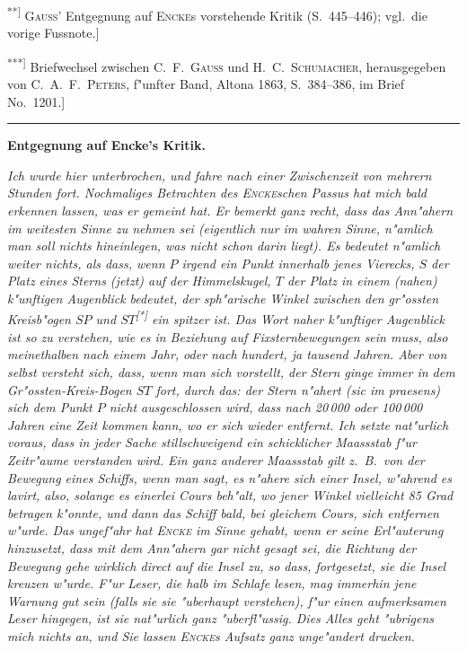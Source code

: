 \documentclass[12pt,a4paper]{article}
\theoremstyle{plain}
\theoremstyle{definition}
\theoremstyle{remark}
\begin{document}
{{\textsuperscript{**]} \textsc{Gauss}' Entgegnung auf \textsc{Encke}s vorstehende Kritik (S.\ 445--446); vgl.\ die vorige Fussnote.]

\textsuperscript{***]} Briefwechsel zwischen C.\ F.\ \textsc{Gauss} und H.\ C.\ \textsc{Schumacher}, herausgegeben von C.\ A.\ F.\ \textsc{Peters}, f"unfter Band, Altona 1863, S.\ 384--386, im Brief No.\ 1201.]
}
\rule{\textwidth}{0.4pt}


\newpage
\begin{center}
\textbf{Entgegnung auf Encke's Kritik.}
\end{center}

\noindent
{\itshape Ich wurde hier unterbrochen, und fahre nach einer Zwischenzeit von mehrern Stunden fort. Nochmaliges Betrachten des \textsc{Encke}schen Passus hat mich bald erkennen lassen, was er gemeint hat. Er bemerkt ganz recht, dass das \glq{}Ann"ahern\grq{} im weitesten Sinne zu nehmen sei (eigentlich nur im wahren Sinne, n"amlich man soll nichts hineinlegen, was nicht schon darin liegt). Es bedeutet n"amlich weiter nichts, als dass, wenn $P$ irgend ein Punkt innerhalb jenes Vierecks, $S$ der Platz eines Sterns (jetzt) auf der Himmelskugel, $T$ der Platz in einem (nahen) k"unftigen Augenblick bedeutet, der sph"arische Winkel zwischen den gr"ossten Kreisb"ogen $SP$ und $ST$\textsuperscript{[*]} ein spitzer ist. Das Wort \glq{}naher k"unftiger Augenblick\grq{} ist so zu verstehen, wie es in Beziehung auf Fixsternbewegungen sein muss, also meinethalben nach einem Jahr, oder nach hundert, ja tausend Jahren. Aber von selbst versteht sich, dass, wenn man sich vorstellt, der Stern ginge immer in dem Gr"ossten-Kreis-Bogen $ST$ fort, durch das: \glq{}der Stern n"ahert (sic im praesens) sich dem Punkt $P$\grq{} nicht ausgeschlossen wird, dass nach 20\,000 oder 100\,000 Jahren eine Zeit kommen kann, wo er sich wieder entfernt. Ich setzte nat"urlich voraus, dass in jeder Sache stillschweigend ein schicklicher Maassstab f"ur Zeitr"aume verstanden wird. Ein ganz anderer Maassstab gilt z.\ B.\ von der Bewegung eines Schiffs, wenn man sagt, es n"ahere sich einer Insel, w"ahrend es lavirt, also, solange es einerlei Cours beh"alt, wo jener Winkel vielleicht 85 Grad betragen k"onnte, und dann das Schiff bald, bei gleichem Cours, sich entfernen w"urde. Das ungef"ahr hat \textsc{Encke} im Sinne gehabt, wenn er seine Erl"auterung hinzusetzt, dass mit dem Ann"ahern gar nicht gesagt sei, die Richtung der Bewegung gehe wirklich direct auf die Insel zu, so dass, fortgesetzt, sie die Insel kreuzen w"urde. F"ur Leser, die halb im Schlafe lesen, mag immerhin jene Warnung gut sein (falls sie sie "uberhaupt verstehen), f"ur einen aufmerksamen Leser hingegen, ist sie nat"urlich ganz "uberfl"ussig. Dies Alles geht "ubrigens mich nichts an, und Sie lassen \textsc{Encke}s Aufsatz ganz unge"andert drucken.}

}
\end{document}
